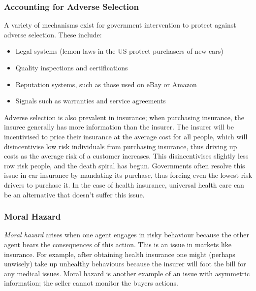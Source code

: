 \documentclass[12pt]{report}
\begin{document}
\begin{flushleft}
\subsubsection*{Accounting for Adverse Selection}
A variety of mechanisms exist for government intervention to protect against
adverse selection. These include:
\begin{itemize}
    \item Legal systems (lemon laws in the US protect purchasers of new cars)
    \item Quality inspections and certifications
    \item Reputation systems, such as those used on eBay or Amazon
    \item Signals such as warranties and service agreements
\end{itemize}

\bigskip
Adverse selection is also prevalent in insurance; when purchasing insurance,
the insuree generally has more information than the insurer. The insurer will
be incentivised to price their insurance at the average cost for all people,
which will disincentivise low risk individuals from purchasing insurance, thus
driving up costs as the average risk of a customer increases. This 
disincentivises slightly less row risk people, and the death spiral has begun.
Governments often resolve this issue in car insurance by mandating its 
purchase, thus forcing even the lowest risk drivers to purchase it. In the case
of health insurance, universal health care can be an alternative that doesn't
suffer this issue.

\subsubsection*{Moral Hazard}
\textit{Moral hazard} arises when one agent engages in risky behaviour because
the other agent bears the consequences of this action. This is an issue in
markets like insurance. For example, after obtaining health insurance one might
(perhaps unwisely) take up unhealthy behaviours because the insurer will foot
the bill for any medical issues. Moral hazard is another example of an issue
with asymmetric information; the seller cannot monitor the buyers actions.


\end{flushleft}
\end{document}
